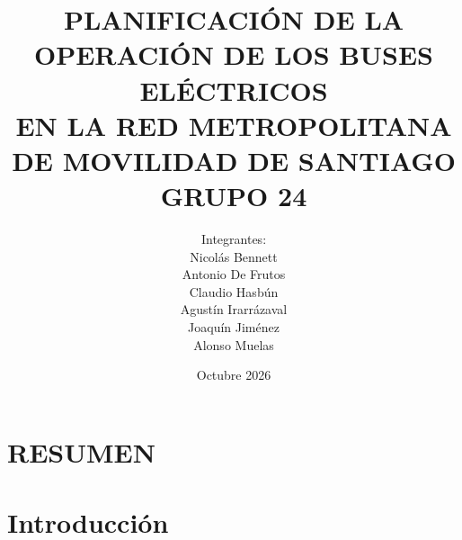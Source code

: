 \documentclass[pdftex,spanish]{pucthesis}
\begin{document}
\raggedbottom


\title[PLANIFICACI\'ON DE LA OPERACI\'ON DE LOS BUSES EL\'ECTRICOS\\ EN LA RED METROPOLITANA DE MOVILIDAD DE SANTIAGO\\ GRUPO 24]
   {\bf PLANIFICACI\'ON DE LA OPERACI\'ON DE LOS BUSES EL\'ECTRICOS\\ EN LA RED METROPOLITANA DE MOVILIDAD DE SANTIAGO\\ GRUPO 24}
\author[Integrantes:]{Integrantes:\\
\textnormal{\small{
Nicol\'as Bennett\\
Antonio De Frutos\\
Claudio Hasb\'un\\
Agust\'in Irarr\'azaval\\
Joaqu\'in Jim\'enez\\
Alonso Muelas}
}}

\address{Escuela de Ingenier\'ia\\
                   Pontificia Universidad Cat\'olica de Chile\\
                   Vicu\~na Mackenna 4860\\
                  Santiago, Chile\\
                  {\it Tel.\/} : 56 (2) 354-2000}

\date{Octubre 2026}

\NoChapterPageNumber
{}
{\hfuzz=11pt\maketitle}

\tableofcontents
\listoffigures
\listoftables
\cleardoublepage
{}

 \label{resumen}
\chapter*{RESUMEN}

\cleardoublepage

\chapter[INTRODUCCI\'ON]{Introducci\'on}

\end{document}
